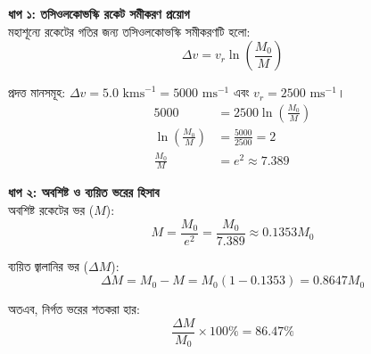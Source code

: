 \documentclass[12pt, a4paper]{article}
\begin{document}
\begin{tcolorbox}[solutionbox={সমাধান (Solution)}]
    \noindent
    \textbf{ধাপ ১: তসিওলকোভস্কি রকেট সমীকরণ প্রয়োগ} \\
    মহাশূন্যে রকেটের গতির জন্য তসিওলকোভস্কি সমীকরণটি হলো:
    \[ \Delta v = v_r \ln\left(\frac{M_0}{M}\right) \]
    
    প্রদত্ত মানসমূহ: $\Delta v = 5.0\text{ kms}^{-1} = 5000\text{ ms}^{-1}$ এবং $v_r = 2500\text{ ms}^{-1}$।
    \begin{align*}
        5000 &= 2500 \ln\left(\frac{M_0}{M}\right) \\
        \ln\left(\frac{M_0}{M}\right) &= \frac{5000}{2500} = 2 \\
        \frac{M_0}{M} &= e^2 \approx 7.389
    \end{align*}
    
    \vspace{0.5em}
    \noindent\textbf{ধাপ ২: অবশিষ্ট ও ব্যয়িত ভরের হিসাব} \\
    অবশিষ্ট রকেটের ভর ($M$):
    \[ M = \frac{M_0}{e^2} = \frac{M_0}{7.389} \approx 0.1353 M_0 \]
    
    ব্যয়িত জ্বালানির ভর ($\Delta M$):
    \[ \Delta M = M_0 - M = M_0 (1 - 0.1353) = 0.8647 M_0 \]
    
    অতএব, নির্গত ভরের শতকরা হার:
    \[ \frac{\Delta M}{M_0} \times 100\% = \mathbf{86.47\%} \]
\end{tcolorbox}
\end{document}
